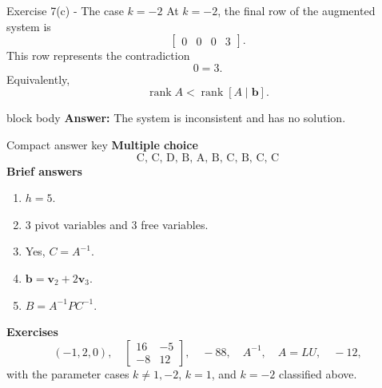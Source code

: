 \documentclass[aspectratio=169]{beamer}
\newcommand{\vect}[1]{\mathbf{#1}}
\newcommand{\rank}{\operatorname{rank}}
\newcommand{\answerbox}[1]{%
  \begin{beamercolorbox}[sep=1.0ex,wd=\linewidth]{block body}
    \textbf{Answer:} #1
  \end{beamercolorbox}}
\begin{document}
\begin{frame}{Exercise 7(c) - The case \texorpdfstring{$k=-2$}{k=-2}}
At $k=-2$, the final row of the augmented system is
\[
\left[\begin{array}{ccc|c}
0&0&0&3
\end{array}\right].
\]
This row represents the contradiction
\[
0=3.
\]
Equivalently,
\[
\rank A<\rank[A\mid\vect b].
\]
\answerbox{The system is inconsistent and has no solution.}
\end{frame}

\begin{frame}{Compact answer key}
\small
\textbf{Multiple choice}
\[
\boxed{\text{C, C, D, B, A, B, C, B, C, C}}
\]
\textbf{Brief answers}
\begin{enumerate}
  \item $h=5$.
  \item 3 pivot variables and 3 free variables.
  \item Yes, $C=A^{-1}$.
  \item $\vect b=\vect v_2+2\vect v_3$.
  \item $B=A^{-1}PC^{-1}$.
\end{enumerate}
\textbf{Exercises}
\[
(-1,2,0),\quad
\begin{bmatrix}16&-5\\-8&12\end{bmatrix},\quad
-88,\quad
A^{-1},\quad
A=LU,\quad
-12,
\]
with the parameter cases $k\ne1,-2$, $k=1$, and $k=-2$ classified above.
\end{frame}
\end{document}
